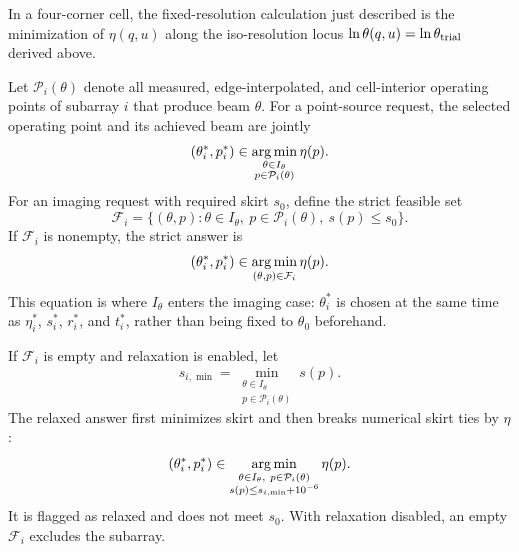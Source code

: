 \documentclass[11pt]{article}
\begin{document}
In a four-corner cell, the fixed-resolution calculation just described is the
minimization of $\eta(q,u)$ along the iso-resolution locus
$\ln\theta(q,u)=\ln\theta_{\rm trial}$ derived above.

Let $\mathcal P_i(\theta)$ denote all measured, edge-interpolated, and
cell-interior operating points of subarray $i$ that produce beam $\theta$.
For a point-source request, the selected operating point and its achieved beam
are jointly
\begin{equation}
 (\theta_i^*,p_i^*)\in
 \mathop{\rm arg\,min}_{\substack{\theta\in I_\theta\\
                                  p\in\mathcal P_i(\theta)}}\eta(p).
 \label{eq:point-source-choice}
\end{equation}
For an imaging request with required skirt $s_0$, define the strict feasible
set
\begin{equation}
 \mathcal F_i=\{(\theta,p):\theta\in I_\theta,
               \ p\in\mathcal P_i(\theta),\ s(p)\le s_0\}.
 \label{eq:strict-set}
\end{equation}
If $\mathcal F_i$ is nonempty, the strict answer is
\begin{equation}
 (\theta_i^*,p_i^*)\in
 \mathop{\rm arg\,min}_{(\theta,p)\in\mathcal F_i}\eta(p).
 \label{eq:strict-choice}
\end{equation}
This equation is where $I_\theta$ enters the imaging case: $\theta_i^*$ is
chosen at the same time as $\eta_i^*$, $s_i^*$, $r_i^*$, and $t_i^*$, rather
than being fixed to $\theta_0$ beforehand.

If $\mathcal F_i$ is empty and relaxation is enabled, let
\begin{equation}
 s_{i,\min}=\min_{\substack{\theta\in I_\theta\\
                            p\in\mathcal P_i(\theta)}}s(p).
\end{equation}
The relaxed answer first minimizes skirt and then breaks numerical skirt ties
by $\eta$:
\begin{equation}
 (\theta_i^*,p_i^*)\in
 \mathop{\rm arg\,min}_{\substack{\theta\in I_\theta,
                                  \ p\in\mathcal P_i(\theta)\\
                                  s(p)\le s_{i,\min}+10^{-6}}}\eta(p).
 \label{eq:relaxed-choice}
\end{equation}
It is flagged as relaxed and does not meet $s_0$.  With relaxation disabled,
an empty $\mathcal F_i$ excludes the subarray.
\end{document}
